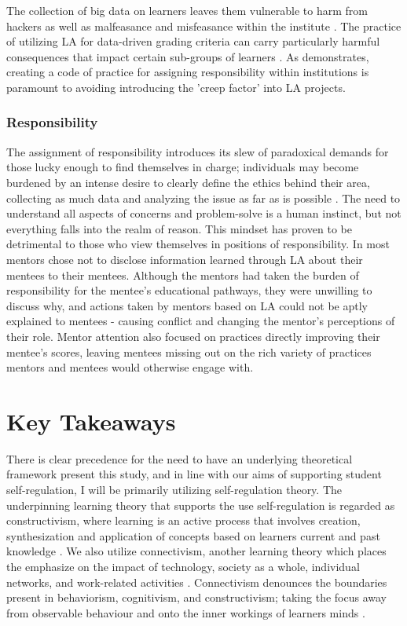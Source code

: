 \documentclass{l4proj}
\begin{document}
The collection of big data on learners leaves them vulnerable to harm from hackers as well as malfeasance and misfeasance within the institute \citep{Daniel2016BigPractice}. The practice of utilizing LA for data-driven grading criteria can carry particularly harmful consequences that impact certain sub-groups of learners \citep{DimopoulosCONFERENCEPerformance}. As \citet{Sclater2016DevelopingAnalytics} demonstrates, creating a code of practice for assigning responsibility within institutions is paramount to avoiding introducing the 'creep factor' into LA projects.

\subsubsection{Responsibility}
\hfill

The assignment of responsibility introduces its slew of paradoxical demands for those lucky enough to find themselves in charge; individuals may become burdened by an intense desire to clearly define the ethics behind their area, collecting as much data and analyzing the issue as far as is possible \citep{Lee2023ItsProgram}. The need to understand all aspects of concerns and problem-solve is a human instinct, but not everything falls into the realm of reason. This mindset has proven to be detrimental to those who view themselves in positions of responsibility. In \citet{Lee2023ItsProgram} most mentors chose not to disclose information learned through LA about their mentees to their mentees. Although the mentors had taken the burden of responsibility for the mentee's educational pathways, they were unwilling to discuss why, and actions taken by mentors based on LA could not be aptly explained to mentees - causing conflict and changing the mentor's perceptions of their role. Mentor attention also focused on practices directly improving their mentee's scores, leaving mentees missing out on the rich variety of practices mentors and mentees would otherwise engage with. 


\section{Key Takeaways}

There is clear precedence for the need to have an underlying theoretical framework present this study, and in line with our aims of supporting student self-regulation, I will be primarily utilizing \citet{zimmerman2009self} self-regulation theory. The underpinning learning theory that supports the use self-regulation is regarded as constructivism, where learning is an active process that involves creation, synthesization and application of concepts based on learners current and past knowledge \citep{mcleod2019constructivism}. We also utilize connectivism, another learning theory which places the emphasize on the impact of technology, society as a whole, individual networks, and work-related activities \citep{duke2013connectivism, goldie2016connectivism}. Connectivism denounces the boundaries present in behaviorism, cognitivism, and constructivism; taking the focus away from observable behaviour and onto the inner workings of learners minds \citep{duke2013connectivism}. 
\end{document}

